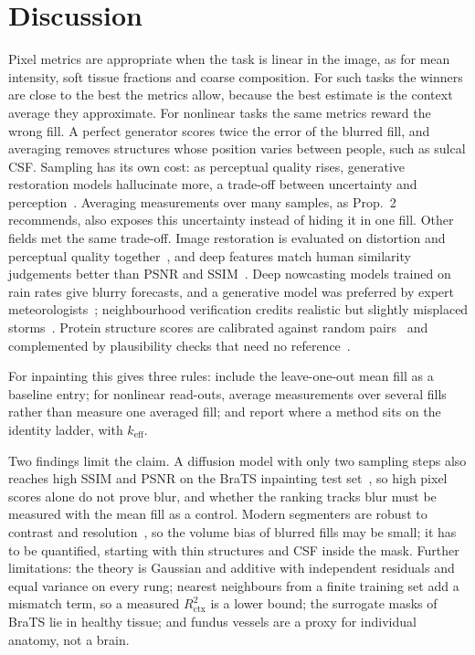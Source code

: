 \documentclass{article}
\begin{document}
\section{Discussion}
\label{sec:discussion}
Pixel metrics are appropriate when the task is linear in the image, as for mean intensity, soft tissue fractions and coarse composition.
For such tasks the winners are close to the best the metrics allow, because the best estimate is the context average they approximate.
For nonlinear tasks the same metrics reward the wrong fill.
A perfect generator scores twice the error of the blurred fill, and averaging removes structures whose position varies between people, such as sulcal CSF.
Sampling has its own cost: as perceptual quality rises, generative restoration models hallucinate more, a trade-off between uncertainty and perception~\cite{cohen2024}.
Averaging measurements over many samples, as Prop.~2 recommends, also exposes this uncertainty instead of hiding it in one fill.
Other fields met the same trade-off.
Image restoration is evaluated on distortion and perceptual quality together~\cite{blau2018}, and deep features match human similarity judgements better than PSNR and SSIM~\cite{zhang2018lpips}.
Deep nowcasting models trained on rain rates give blurry forecasts, and a generative model was preferred by expert meteorologists~\cite{ravuri2021}; neighbourhood verification credits realistic but slightly misplaced storms~\cite{roberts2008}.
Protein structure scores are calibrated against random pairs~\cite{zhang2004} and complemented by plausibility checks that need no reference~\cite{mariani2013,chen2010}.

For inpainting this gives three rules: include the leave-one-out mean fill as a baseline entry; for nonlinear read-outs, average measurements over several fills rather than measure one averaged fill; and report where a method sits on the identity ladder, with $k_{\mathrm{eff}}$.

Two findings limit the claim.
A diffusion model with only two sampling steps also reaches high SSIM and PSNR on the BraTS inpainting test set~\cite{durrer2025fastwdm3d}, so high pixel scores alone do not prove blur, and whether the ranking tracks blur must be measured with the mean fill as a control.
Modern segmenters are robust to contrast and resolution~\cite{billot2023synthseg}, so the volume bias of blurred fills may be small; it has to be quantified, starting with thin structures and CSF inside the mask.
Further limitations: the theory is Gaussian and additive with independent residuals and equal variance on every rung; nearest neighbours from a finite training set add a mismatch term, so a measured $R^2_{\mathrm{ctx}}$ is a lower bound; the surrogate masks of BraTS lie in healthy tissue; and fundus vessels are a proxy for individual anatomy, not a brain.
\end{document}
